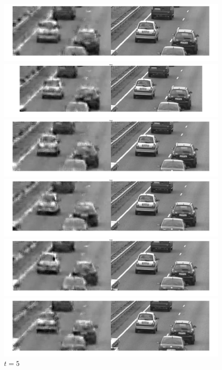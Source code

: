 \documentclass{article}
\begin{document}
\begin{figure}[!htb]
	\centering
	\begin{minipage}[!htb]{0.4\linewidth}
		\centering
			\includegraphics[scale=0.07]{t7/t1.jpg}
			\caption{$t = 1$}
			\includegraphics[scale=0.07]{t7/t2.jpg}
			\caption{$t = 2$}
			\includegraphics[scale=0.07]{t7/t3.jpg}
			\caption{$t = 3$}
			\includegraphics[scale=0.07]{t7/t4.jpg}
			\caption{$t = 4$}
	\end{minipage}
\begin{minipage}[!htb]{0.5\linewidth}
\centering
	\includegraphics[scale=0.06]{t7/t5.jpg}
	\caption{$t = 5$}
	\includegraphics[scale=0.06]{t7/t6.jpg}

\end{minipage}
\end{figure}
\end{document}
